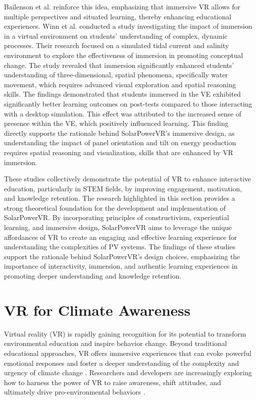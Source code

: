 \documentclass[draft, final]{vutinfth} %
\begin{document}
Bailenson et al. \cite{Bailenson2008Transformations} reinforce this idea, emphasizing that immersive VR allows for multiple perspectives and situated learning, thereby enhancing educational experiences. Winn et al. \cite{Winn2002Immersion} conducted a study investigating the impact of immersion in a virtual environment on students' understanding of complex, dynamic processes. Their research focused on a simulated tidal current and salinity environment to explore the effectiveness of immersion in promoting conceptual change. The study revealed that immersion significantly enhanced students' understanding of three-dimensional, spatial phenomena, specifically water movement, which requires advanced visual exploration and spatial reasoning skills. The findings demonstrated that students immersed in the VE exhibited significantly better learning outcomes on post-tests compared to those interacting with a desktop simulation. This effect was attributed to the increased sense of presence within the VE, which positively influenced learning. This finding directly supports the rationale behind SolarPowerVR's immersive design, as understanding the impact of panel orientation and tilt on energy production requires spatial reasoning and visualization, skills that are enhanced by VR immersion.

These studies collectively demonstrate the potential of VR to enhance interactive education, particularly in STEM fields, by improving engagement, motivation, and knowledge retention. The research highlighted in this section provides a strong theoretical foundation for the development and implementation of SolarPowerVR. By incorporating principles of constructivism, experiential learning, and immersive design, SolarPowerVR aims to leverage the unique affordances of VR to create an engaging and effective learning experience for understanding the complexities of PV systems. The findings of these studies support the rationale behind SolarPowerVR's design choices, emphasizing the importance of interactivity, immersion, and authentic learning experiences in promoting deeper understanding and knowledge retention.

\section{VR for Climate Awareness}

Virtual reality (VR) is rapidly gaining recognition for its potential to transform environmental education and inspire behavior change. Beyond traditional educational approaches, VR offers immersive experiences that can evoke powerful emotional responses and foster a deeper understanding of the complexity and urgency of climate change \cite{Ball2023Effects}. Researchers and developers are increasingly exploring how to harness the power of VR to raise awareness, shift attitudes, and ultimately drive pro-environmental behaviors \cite{McEvoy2023Climate}.
\end{document}
